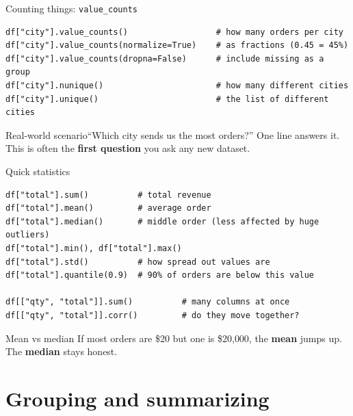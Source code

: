 \documentclass[aspectratio=169,10pt]{beamer}
\newcommand{\scenario}[1]{\begin{exampleblock}{Real-world scenario}#1\end{exampleblock}}
\begin{document}
\begin{frame}[fragile]{Counting things: \texttt{value\_counts}}
\begin{lstlisting}
df["city"].value_counts()                  # how many orders per city
df["city"].value_counts(normalize=True)    # as fractions (0.45 = 45%)
df["city"].value_counts(dropna=False)      # include missing as a group
df["city"].nunique()                       # how many different cities
df["city"].unique()                        # the list of different cities
\end{lstlisting}
  \scenario{``Which city sends us the most orders?'' One line answers it. This is often the
  \textbf{first question} you ask any new dataset.}
\end{frame}

\begin{frame}[fragile]{Quick statistics}
\begin{lstlisting}
df["total"].sum()          # total revenue
df["total"].mean()         # average order
df["total"].median()       # middle order (less affected by huge outliers)
df["total"].min(), df["total"].max()
df["total"].std()          # how spread out values are
df["total"].quantile(0.9)  # 90% of orders are below this value

df[["qty", "total"]].sum()          # many columns at once
df[["qty", "total"]].corr()         # do they move together?
\end{lstlisting}
  \begin{block}{Mean vs median}
    If most orders are \$20 but one is \$20{,}000, the \textbf{mean} jumps up. The
    \textbf{median} stays honest.
  \end{block}
\end{frame}

\section{Grouping and summarizing}
\end{document}
